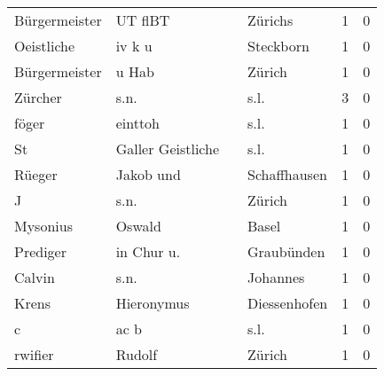 \begin{center}
\begin{tiny}
\begin{longtabu}{llllrr}
            Bürgermeister &                            UT flBT &             &                                     Zürichs &          1 &         0 \\
               Oeistliche &                             iv k u &             &                                   Steckborn &          1 &         0 \\
            Bürgermeister &                              u Hab &             &                                      Zürich &          1 &         0 \\
                  Zürcher &                               s.n. &             &                                        s.l. &          3 &         0 \\
                    föger &                            einttoh &             &                                        s.l. &          1 &         0 \\
                       St &                  Galler Geistliche &             &                                        s.l. &          1 &         0 \\
                   Rüeger &                          Jakob und &             &                                Schaffhausen &          1 &         0 \\
                        J &                               s.n. &             &                                      Zürich &          1 &         0 \\
                 Mysonius &                             Oswald &             &                                       Basel &          1 &         0 \\
                 Prediger &                         in Chur u. &             &                                  Graubünden &          1 &         0 \\
                   Calvin &                               s.n. &             &                                    Johannes &          1 &         0 \\
                    Krens &                         Hieronymus &             &                                Diessenhofen &          1 &         0 \\
                        c &                               ac b &             &                                        s.l. &          1 &         0 \\
                  rwifier &                             Rudolf &             &                                      Zürich &          1 &         0 \\

\end{longtabu}
\end{tiny}
\end{center}
